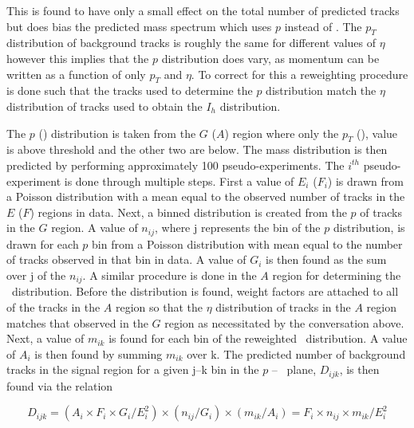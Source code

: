 This is found to have only a small effect on the total number of predicted tracks but does bias the predicted mass spectrum which uses $p$ instead of \pt.
The $p_T$ distribution of background tracks is roughly the same for different values of $\eta$ 
however this implies that the $p$ distribution does vary, as momentum can be written
as a function of only $p_T$ and $\eta$. To correct for this a reweighting procedure is done such that the tracks
used to determine the $p$ distribution match the $\eta$ distribution of tracks used to obtain the $I_h$ distribution.

The $p$ (\ih) distribution
is taken from the $G$ ($A$) region where only the $p_T$  (\ias), value is above threshold and the other two are below. The mass distribution is then predicted by performing
approximately 100 pseudo-experiments. The $i^{th}$ pseudo-experiment is done through multiple steps. First a value of $E_{i}$ ($F_i$) is drawn from a Poisson
distribution with a mean equal to the observed number of tracks in the $E$ ($F$) regions in data.
Next, a binned distribution is created from the $p$ of tracks in the $G$ region. A value of $n_{ij}$, where j represents the bin of the $p$ distribution, is drawn for
each $p$ bin from a Poisson distribution with mean equal to the number of tracks observed in that bin in data. A value of $G_i$ is then found as the sum over j of the
$n_{ij}$. A similar procedure is done in the $A$ region for determining the \ih\ distribution. Before the distribution is found, weight factors are attached to all of
the tracks in the $A$ region so that the $\eta$ distribution of tracks in the $A$ region matches that observed in the $G$ region as necessitated by the conversation
above. Next, a value of $m_{ik}$ is found for each bin of the reweighted \ih\ distribution. A value of $A_i$ is then found by summing $m_{ik}$ over k.
The predicted number of background tracks in the signal region for a given j--k bin in the $p$ -- \dedx\ plane, $D_{ijk}$, is then found via the relation

\begin{equation}
D_{ijk} = (A_i \times F_i \times G_i / E_{i}^{2}) \times (n_{ij}/G_i) \times (m_{ik}/A_i) = F_i \times n_{ij} \times m_{ik} / E_{i}^{2}
\label{eq:MassPrediction}
\end{equation}

